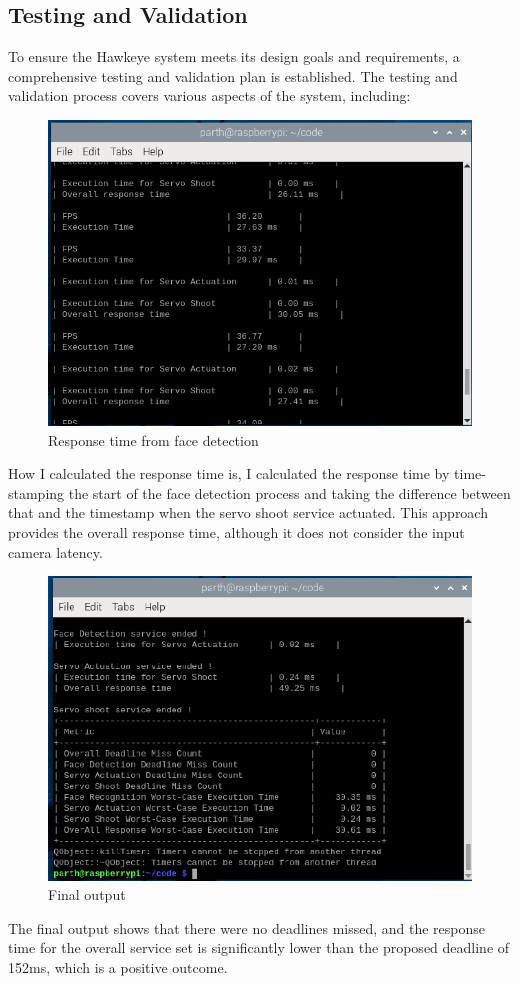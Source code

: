 \documentclass[a4paper,11pt]{article}%
\begin{document}
\subsection{Testing and Validation}
To ensure the Hawkeye system meets its design goals and requirements, a comprehensive testing and validation plan is established. The testing and validation process covers various aspects of the system, including:

\begin{figure}[H]
    \centering
    \includegraphics[scale=0.60]{figures/response_time_log.png}
    \caption{Response time from face detection}
\end{figure}

How I calculated the response time is, I calculated the response time by time-stamping the start of the face detection process and taking the difference between that and the timestamp when the servo shoot service actuated. This approach provides the overall response time, although it does not consider the input camera latency.

\begin{figure}[H]
    \centering
    \includegraphics[scale=0.6]{figures/final_output.png}
    \caption{Final output}
\end{figure}
The final output shows that there were no deadlines missed, and the response time for the overall service set is significantly lower than the proposed deadline of 152ms, which is a positive outcome.
\end{document}
